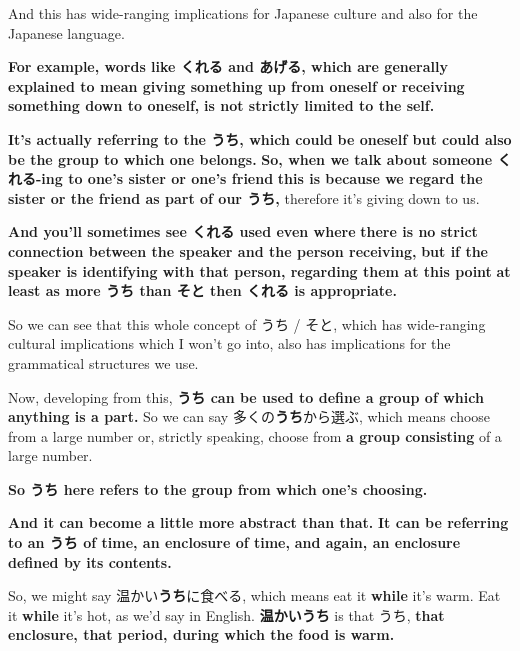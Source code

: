 {}

And this has wide-ranging implications for Japanese culture and also for the Japanese language.

\thinrule

{\bf For example, words like くれる and あげる, which are generally} {\bf explained to mean giving something up from oneself or} {\bf receiving something down to oneself,} {\bf is not strictly limited to the self.}

\thinrule

{\bf It's actually referring to the うち, which could} {\bf be oneself but could also be the group to which one belongs.} {\bf So, when we talk about someone くれる-ing to one's sister or one's friend} {\bf this is because we regard the sister or the friend as part of our うち,} therefore it's giving down to us.

{\bf And you'll sometimes see くれる used even where} {\bf there is no strict connection between the speaker and the person receiving,} {\bf but if the speaker is identifying with that person, regarding them at this point} {\bf at least as more うち than そと then くれる is appropriate.}

\thinrule

So we can see that this whole concept of うち / そと, which has wide-ranging cultural implications which I won't go into, also has implications for the grammatical structures we use.

\stopsectionlevel

\startsectionlevel[title={うち used to define a group that x is a part of},reference={うち-used-to-define-a-group-that-x-is-a-part-of}]

Now, developing from this, {\bf うち can be used to define a group of which anything is a part.} So we can say 多くの{\bf うち}から選ぶ, which means choose from a large number or, strictly speaking, choose from {\bf a group consisting} of a large number.

{}

{\bf So うち here refers to the group from which one's choosing.}

\thinrule

{\bf And it can become a little more abstract than that.} {\bf It can be referring to an うち of time, an enclosure of time,} {\bf and again, an enclosure defined by its contents.}

So, we might say 温かい{\bf うち}に食べる, which means eat it {\bf while} it's warm. Eat it {\bf while} it's hot, as we'd say in English. {\bf 温かいうち} is that うち, {\bf that enclosure, that period, during which the food is warm.}

